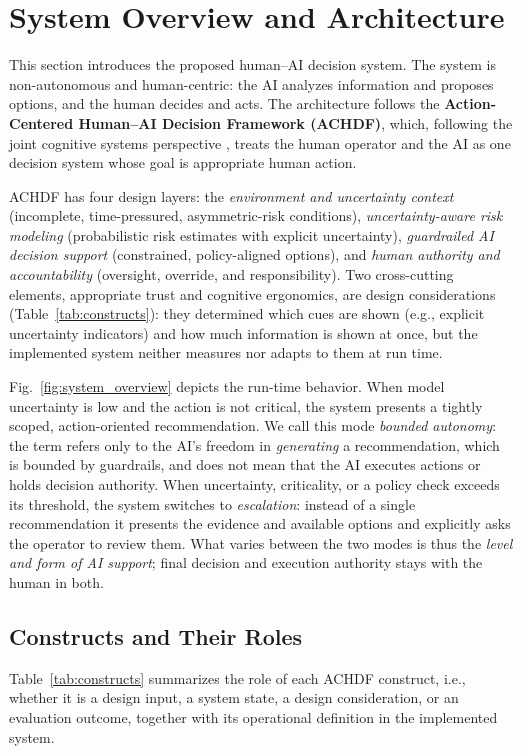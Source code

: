 \documentclass[journal]{IEEEtran}
\theoremstyle{plain}
\theoremstyle{definition}
\begin{document}
    \section{System Overview and Architecture}
    \label{sec:system}
    This section introduces the proposed human--AI decision system. The system is non-autonomous and human-centric: the AI analyzes information and proposes options, and the human decides and acts. The architecture follows the \textbf{Action-Centered Human--AI Decision Framework (ACHDF)}, which, following the joint cognitive systems perspective \cite{Hollnagel2005JCS,Woods2006JCS}, treats the human operator and the AI as one decision system whose goal is appropriate human action.

    ACHDF has four design layers: the \emph{environment and uncertainty context} (incomplete, time-pressured, asymmetric-risk conditions), \emph{uncertainty-aware risk modeling} (probabilistic risk estimates with explicit uncertainty), \emph{guardrailed AI decision support} (constrained, policy-aligned options), and \emph{human authority and accountability} (oversight, override, and responsibility). Two cross-cutting elements, appropriate trust \cite{Lee2004} and cognitive ergonomics, are design considerations (Table~\ref{tab:constructs}): they determined which cues are shown (e.g., explicit uncertainty indicators) and how much information is shown at once, but the implemented system neither measures nor adapts to them at run time.

    Fig.~\ref{fig:system_overview} depicts the run-time behavior. When model uncertainty is low and the action is not critical, the system presents a tightly scoped, action-oriented recommendation. We call this mode \emph{bounded autonomy}: the term refers only to the AI's freedom in \emph{generating} a recommendation, which is bounded by guardrails, and does not mean that the AI executes actions or holds decision authority. When uncertainty, criticality, or a policy check exceeds its threshold, the system switches to \emph{escalation}: instead of a single recommendation it presents the evidence and available options and explicitly asks the operator to review them. What varies between the two modes is thus the \emph{level and form of AI support}; final decision and execution authority stays with the human in both.

    \subsection{Constructs and Their Roles}
    \label{sec:constructs}
    Table~\ref{tab:constructs} summarizes the role of each ACHDF construct, i.e., whether it is a design input, a system state, a design consideration, or an evaluation outcome, together with its operational definition in the implemented system.
\end{document}
